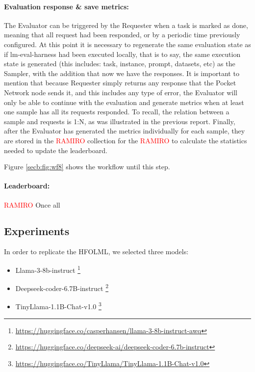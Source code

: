 \paragraph{Evaluation response \& save metrics:}
The Evaluator can be triggered by the Requester when a task is marked as done, meaning that all request had been responded, or by a periodic time previously configured. 
At this point it is necessary to regenerate the same evaluation state as if lm-eval-harness had been executed locally, that is to say, the same execution state is generated (this includes: task, instance, prompt, datasets, etc) as the Sampler, with the addition that now we have the responses. 
It is important to mention that because Requester simply returns any response that the Pocket Network node sends it, and this includes any type of error, the Evaluator will only be able to continue with the evaluation and generate metrics when at least one sample has all its requests responded. 
To recall, the relation between a sample and requests is 1:N, as was illustrated in the previous report. 
Finally, after the Evaluator has generated the metrics individually for each sample, they are stored in the \textcolor{red}{RAMIRO} collection for the \textcolor{red}{RAMIRO} to calculate the statistics needed to update the leaderboard. 

Figure \ref{secb:fig:wf8} shows the workflow until this step.


\paragraph{Leaderboard:}
\textcolor{red}{RAMIRO}
Once all


\subsection{Experiments}

In order to replicate the \gls{HFOLML}, we selected three models:

\begin{itemize}[noitemsep]
    \item Llama-3-8b-instruct \footnote{\url{https://huggingface.co/casperhansen/llama-3-8b-instruct-awq}}
    \item Deepseek-coder-6.7B-instruct \footnote{\url{https://huggingface.co/deepseek-ai/deepseek-coder-6.7b-instruct}}
    \item TinyLlama-1.1B-Chat-v1.0 \footnote{\url{https://huggingface.co/TinyLlama/TinyLlama-1.1B-Chat-v1.0}}
\end{itemize}

